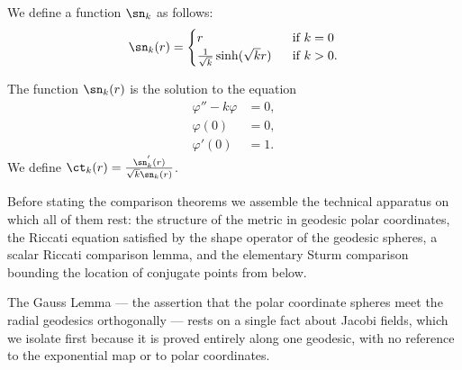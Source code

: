 \begin{definition}
\label{def:sinh-comparison-function}
\leanok


We define a function $\sn_k$ as follows:$$\sn_k(r)=\begin{cases}
r \ \  & \text{if }k=0 \\
\frac{1}{\sqrt{k}}\sinh(\sqrt{k}r) \ \ & \text{if } k>0.
\end{cases}$$
\end{definition}

The function $\sn_{k}(r)$ is the solution to the equation
\begin{align*}
 \varphi'' - k\varphi &= 0,\\
\varphi(0) &= 0,\\
\varphi'(0) &= 1.
\end{align*}
We define
 $\ct_{k}(r) = \frac{\sn_{k}^{'}(r)}{\sqrt{k}\sn_{k}(r)}$.

Before stating the comparison theorems we assemble the technical
apparatus on which all of them rest: the structure of the metric in
geodesic polar coordinates, the Riccati equation satisfied by the
shape operator of the geodesic spheres, a scalar Riccati comparison
lemma, and the elementary Sturm comparison bounding the location of
conjugate points from below.

The Gauss Lemma — the assertion that the polar coordinate spheres meet
the radial geodesics orthogonally — rests on a single fact about Jacobi
fields, which we isolate first because it is proved entirely along one
geodesic, with no reference to the exponential map or to polar
coordinates.


